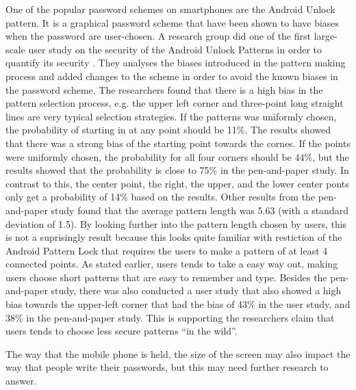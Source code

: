   One of the popular password schemes on smartphones are the Android Unlock pattern. It is a graphical password scheme that have been shown to have biases when the password are user-chosen. A research group did one of the first large-scale user study on the security of the Android Unlock Patterns in order to quantify its security \cite{Uellenbeck}. They analyses the biases introduced in the pattern making process and added changes to the scheme in order to avoid the known biases in the password scheme. The researchers found that there is a high bias in the pattern selection process, e.g. the upper left corner and three-point long straight lines are very typical selection strategies. If the patterns was uniformly chosen, the probability of starting in at any point should be 11\%. The results showed that there was a strong bias of the starting point towards the cornes. If the points were uniformly chosen, the probability for all four corners should be 44\%, but the results showed that the probability is close to 75\% in the pen-and-paper study. In contrast to this, the center point, the right, the upper, and the lower center ponts only get a probability of 14\% based on the results. Other results from the pen-and-paper study found that the average pattern length was 5.63 (with a standard deviation of 1.5). By looking further into the pattern length chosen by users, this is not a suprisingly result because this looks quite familiar with restiction of the Android Pattern Lock that requires the users to make a pattern of at least 4 connected points. As stated earlier, users tends to take a easy way out, making users choose short patterns that are easy to remember and type. Besides the pen-and-paper study, there was also conducted a user study that also showed a high bias towards the upper-left corner that had the bias of 43\% in the user study, and 38\% in the pen-and-paper study. This is supporting the researchers claim that users tends to choose less secure patterns ``in the wild''. 

  The way that the mobile phone is held, the size of the screen may also impact the way that people write their passwords, but this may need further research to answer.

  